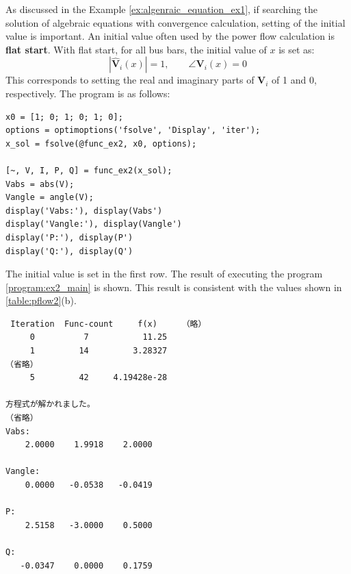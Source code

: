 \documentclass[graybox, envcountchap]{svmult}
\begin{document}
\begin{example}
As discussed in the Example \nobreak\ref{ex:algenraic_equation_ex1}, if searching the solution of algebraic equations with convergence calculation, setting of the initial value is important.
An initial value often used by the power flow calculation is \textbf{flat start}. With flat start, for all bus bars, the initial value of $x$ is set as:
\[
|\hat{\bm V}_i(x)|=1
,\qquad
\angle \bm V_i(x) = 0
\]
This corresponds to setting the real and imaginary parts of $\bm V_i$ of 1 and 0, respectively.
The program is as follows:

\smallskip
\begin{PROGRAMA}[count,title={main\_ex2.m}]\label{program:ex2_main}
\begin{verbatim}
x0 = [1; 0; 1; 0; 1; 0];
options = optimoptions('fsolve', 'Display', 'iter');
x_sol = fsolve(@func_ex2, x0, options);

[~, V, I, P, Q] = func_ex2(x_sol);
Vabs = abs(V);
Vangle = angle(V);
display('Vabs:'), display(Vabs')
display('Vangle:'), display(Vangle')
display('P:'), display(P')
display('Q:'), display(Q')
\end{verbatim}
\end{PROGRAMA}

The initial value is set in the first row. The result of executing the program \nobreak\ref{program:ex2_main} is shown.
This result is consistent with the values shown in \ref{table:pflow2}(b).

\smallskip
\begin{execution}
\begin{verbatim}
 Iteration  Func-count     f(x)     （略）
     0          7           11.25 
     1         14         3.28327 
（省略）
     5         42     4.19428e-28

方程式が解かれました。
（省略）
Vabs:
    2.0000    1.9918    2.0000

Vangle:
    0.0000   -0.0538   -0.0419

P:
    2.5158   -3.0000    0.5000

Q:
   -0.0347    0.0000    0.1759
\end{verbatim}
\end{execution}

\end{example}

\end{document}
